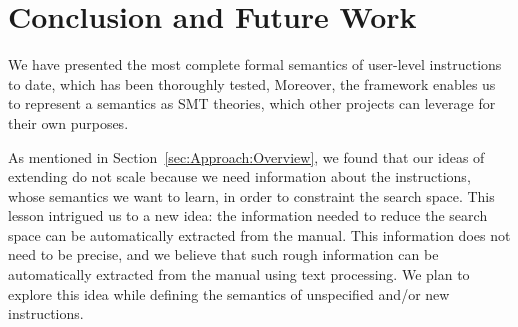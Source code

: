 \section{Conclusion and Future Work}\label{sec:conc}

We have presented the most complete formal semantics of \ISA user-level instructions
to date, which has been thoroughly tested, 
Moreover, the \K framework enables us to represent a semantics as SMT theories,
which other projects can
leverage for their own purposes.

As mentioned in Section~\ref{sec:Approach:Overview}, we found that our ideas of extending \Strata do not scale because we need information about the instructions, whose semantics we want to learn, in order to constraint the search space. This lesson intrigued us to a new idea: the information needed to reduce the search space can be automatically extracted from the manual. This  information does not need to be precise, and we believe that such rough information can be automatically extracted from the manual using text processing.  We plan to explore this idea while defining the semantics of unspecified and/or new instructions.



 


   
